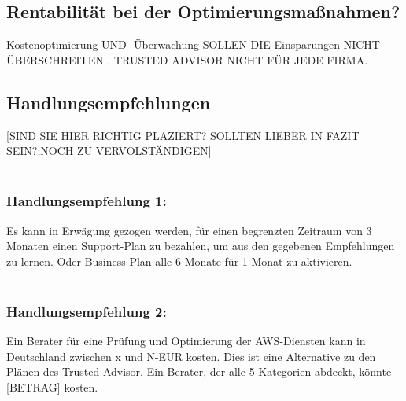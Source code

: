 \subsection*{Rentabilität bei der Optimierungsmaßnahmen?}
Kostenoptimierung UND -Überwachung SOLLEN DIE Einsparungen NICHT ÜBERSCHREITEN . 
TRUSTED ADVISOR NICHT FÜR JEDE FIRMA.

\subsection*{Handlungsempfehlungen}
[SIND SIE HIER RICHTIG PLAZIERT? SOLLTEN LIEBER IN FAZIT SEIN?;NOCH ZU VERVOLSTÄNDIGEN]
\\\\
\subsubsection*{Handlungsempfehlung 1:} 
Es kann in Erwägung gezogen werden, für einen begrenzten Zeitraum von 3 Monaten einen Support-Plan zu bezahlen, um aus den gegebenen Empfehlungen zu lernen. Oder Business-Plan alle 6 Monate für 1 Monat zu aktivieren.  
\\\\
\subsubsection*{Handlungsempfehlung 2:} 
Ein Berater für eine Prüfung und Optimierung der AWS-Diensten kann in Deutschland zwischen x und N-EUR kosten. Dies ist eine Alternative zu den Plänen des Trusted-Advisor. Ein Berater, der alle 5 Kategorien abdeckt, könnte [BETRAG] kosten. %
\\\\

